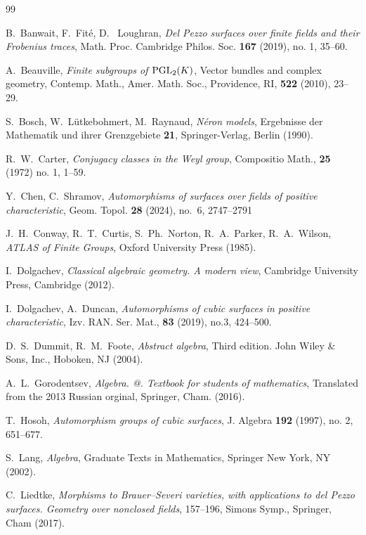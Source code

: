 \documentclass{amsart}
\makeatletter
\numberwithin{equation}{section}
\theoremstyle{plain}
\theoremstyle{definition}
\theoremstyle{remark}
\newcommand*{\rom}[1]{\expandafter\@slowromancap\romannumeral #1@}
\makeatother
\begin{document}
\begin{thebibliography}{99}

B.~Banwait, F.~Fit\'{e}, D.~ Loughran, \emph{Del Pezzo surfaces over finite fields and their Frobenius traces}, Math. Proc. Cambridge Philos. Soc. \textbf{167} (2019), no. 1, 35--60.

A.~Beauville,  \emph{Finite subgroups of ${\rm PGL}_2(K)$}, Vector bundles and complex geometry,  Contemp. Math.,  Amer. Math. Soc., Providence, RI, \textbf{522}  (2010), 23--29.

S.~Bosch, W.~Lütkebohmert,  M.~Raynaud,  \emph{Néron models}, Ergebnisse der Mathematik und ihrer Grenzgebiete  \textbf{21}, Springer-Verlag, Berlin (1990).


R.~W.~Carter, \emph{Conjugacy classes in the Weyl group}, Compositio Math., \textbf{25} (1972) no. 1, 1--59.


Y.~Chen, C.~Shramov, \emph{Automorphisms of surfaces over fields of positive characteristic},  Geom. Topol. \textbf{28} (2024), no.~6, 2747--2791


 J.~H.~Conway, R.~T.~Curtis, S.~Ph.~Norton, R.~A.~Parker, R.~A.~Wilson, \emph{ATLAS of Finite Groups}, Oxford University Press (1985).


I.~Dolgachev, \emph{Classical algebraic geometry. A modern view}, Cambridge University Press, Cambridge (2012).


I.~Dolgachev, A.~Duncan, \emph{Automorphisms of cubic surfaces in positive characteristic}, Izv. RAN. Ser. Mat., \textbf{83} (2019), no.3, 424--500.


D.~S.~Dummit, R.~M.~Foote,  \emph{Abstract algebra}, Third edition. John Wiley \& Sons, Inc., Hoboken, NJ (2004). 


A.~L.~Gorodentsev,  \emph{Algebra. \rom{1}. Textbook for students of mathematics}, Translated from the 2013 Russian orginal, Springer, Cham. (2016).


T.~Hosoh, \emph{Automorphism groups of cubic surfaces}, J. Algebra \textbf{192} (1997), no. 2, 651--677.


S.~Lang, \emph{Algebra}, Graduate Texts in Mathematics, Springer New York, NY (2002).


C.~Liedtke,  \emph{Morphisms to Brauer--Severi varieties, with applications to del Pezzo surfaces. Geometry over nonclosed fields}, 157--196, Simons Symp., Springer, Cham (2017).


\end{thebibliography}
\end{document}
